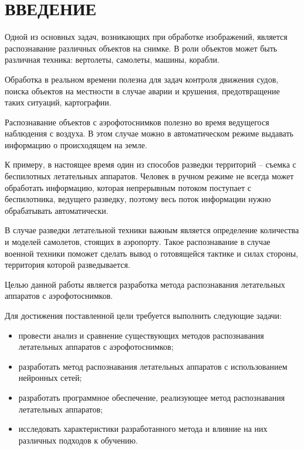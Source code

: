 \chapter*{ВВЕДЕНИЕ}

Одной из основных задач, возникающих при обработке изображений, является распознавание различных объектов на снимке. В роли объектов может быть различная техника: вертолеты, самолеты, машины, корабли.

Обработка в реальном времени полезна для задач контроля движения судов, поиска объектов на местности в случае аварии и крушения, предотвращение таких ситуаций, картографии.

Распознавание объектов с аэрофотоснимков полезно во время ведущегося наблюдения с воздуха. В этом случае можно  в автоматическом режиме выдавать информацию о происходящем на земле.

К примеру, в настоящее время один из способов разведки территорий -- съемка с беспилотных летательных аппаратов. Человек в ручном режиме не всегда может обработать информацию, которая непрерывным потоком поступает с беспилотника, ведущего разведку, поэтому весь поток информации нужно обрабатывать автоматически. 

В случае разведки летательной техники важным является определение количества и моделей самолетов, стоящих в аэропорту. Такое распознавание в случае военной техники поможет сделать вывод о готовящейся тактике и силах стороны, территория которой разведывается.

Целью данной работы является разработка метода распознавания летательных аппаратов с аэрофотоснимков.

Для достижения поставленной цели требуется выполнить следующие задачи:
\begin{itemize}
	\item провести анализ и сравнение существующих методов распознавания летательных аппаратов с аэрофотоснимков;
	\item разработать метод распознавания летательных аппаратов с использованием нейронных сетей;
	\item разработать программное обеспечение, реализующее метод распознавания летательных аппаратов;
	\item исследовать характеристики разработанного метода и влияние на них различных подходов к обучению.
\end{itemize}